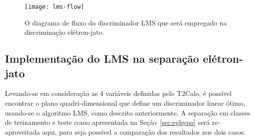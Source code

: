 \begin{figure}
\begin{center}
\texttt{[image: lms-flow]}
\end{center}
\caption{O diagrama de fluxo do discriminador LMS que será empregado na
discriminação elétron-jato.}
\label{fig:lms-flow}
\end{figure}

\subsection{Implementação do LMS na separação e\-lé\-tron-jato}
\label{sec:lms-ej}

Levando-se em consideração as 4 variáveis definidas pelo T2Calo, é possível
encontrar o plano quadri-dimensional que define um discriminador linear ótimo,
usando-se o algoritmo LMS, como descrito anteriormente. A separação em classes
de treinamento e teste como apresentada na Seção~\ref{sec:eghypo} será
re-aproveitada aqui, para seja possível a comparação dos resultados nos dois
casos.

